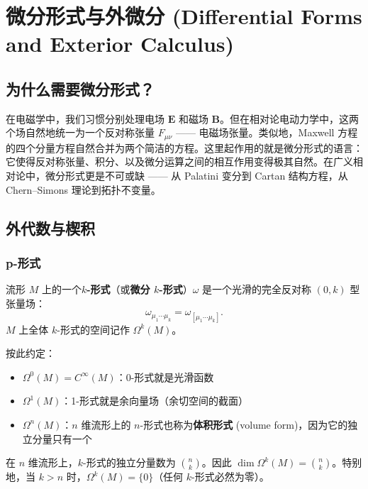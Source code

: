 \chapter{微分形式与外微分 (Differential Forms and Exterior Calculus)}
\label{chap:forms}

\section{为什么需要微分形式？}

\begin{note}[物理动机]
在电磁学中，我们习惯分别处理电场 $\mathbf{E}$ 和磁场 $\mathbf{B}$。但在相对论电动力学中，这两个场自然地统一为一个反对称张量 $F_{\mu\nu}$ —— 电磁场张量。类似地，Maxwell 方程的四个分量方程自然合并为两个简洁的方程。这里起作用的就是微分形式的语言：它使得反对称张量、积分、以及微分运算之间的相互作用变得极其自然。在广义相对论中，微分形式更是不可或缺 —— 从 Palatini 变分到 Cartan 结构方程，从 Chern--Simons 理论到拓扑不变量。
\end{note}

\section{外代数与楔积}

\subsection{p-形式}

\begin{definition}[$k$-形式]
流形 $M$ 上的一个\textbf{$k$-形式}（或\textbf{微分 $k$-形式}）$\omega$ 是一个光滑的完全反对称 $(0,k)$ 型张量场：
\begin{equation}
    \omega_{\mu_1\cdots\mu_k} = \omega_{[\mu_1\cdots\mu_k]}.
\end{equation}
$M$ 上全体 $k$-形式的空间记作 $\Omega^k(M)$。
\end{definition}

按此约定：
\begin{itemize}
    \item $\Omega^0(M) = C^\infty(M)$：0-形式就是光滑函数
    \item $\Omega^1(M)$：1-形式就是余向量场（余切空间的截面）
    \item $\Omega^n(M)$：$n$ 维流形上的 $n$-形式也称为\textbf{体积形式} (volume form)，因为它的独立分量只有一个
\end{itemize}

\begin{property}[$k$-形式的独立分量数]
在 $n$ 维流形上，$k$-形式的独立分量数为 $\binom{n}{k}$。因此 $\dim \Omega^k(M) = \binom{n}{k}$。特别地，当 $k > n$ 时，$\Omega^k(M) = \{0\}$（任何 $k$-形式必然为零）。
\end{property}

